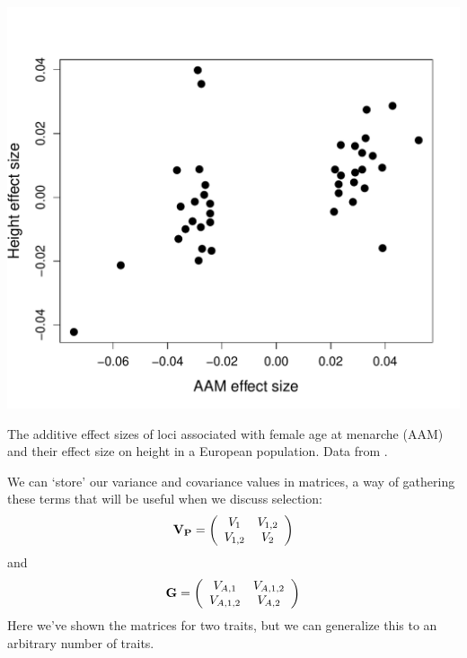 \begin{marginfigure}
\begin{center}
\includegraphics[width= \textwidth]{Journal_figs/Quant_gen/pickrell_pleiotropy/AAM_height.pdf}
\end{center}
\caption{The additive effect sizes of loci associated with female age
  at menarche (AAM) and their effect size on height in a European
  population. Data from \citet{pickrell2016detection}. } \label{fig:AAM_height}   
\end{marginfigure}

We can `store' our variance and covariance values in matrices, a way of gathering these terms that will be useful when we discuss selection: 
\begin{equation}
\bf{V_P}= \left( \begin{array}{cc} 
V_{1} & V_{1,2} \\
V_{1,2} & V_{2} \\
\end{array} \right) \label{P_matrix}
\end{equation}
and
\begin{equation}
\bf{G}= \left( \begin{array}{cc} 
V_{A,1} & V_{A,1,2} \\
V_{A,1,2} & V_{A,2} \\
\end{array} \right)  \label{G_matrix}
\end{equation}
Here we've shown the matrices for two traits, but we can generalize this to an arbitrary number of traits.

